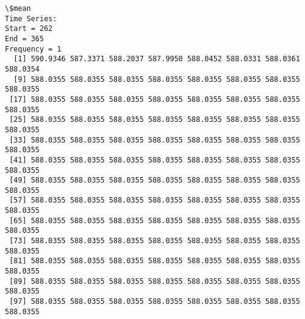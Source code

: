 \documentclass[11pt]{article}
\begin{document}
    \begin{Verbatim}[commandchars=\\\{\}]
\$mean
Time Series:
Start = 262 
End = 365 
Frequency = 1 
  [1] 590.9346 587.3371 588.2037 587.9950 588.0452 588.0331 588.0361 588.0354
  [9] 588.0355 588.0355 588.0355 588.0355 588.0355 588.0355 588.0355 588.0355
 [17] 588.0355 588.0355 588.0355 588.0355 588.0355 588.0355 588.0355 588.0355
 [25] 588.0355 588.0355 588.0355 588.0355 588.0355 588.0355 588.0355 588.0355
 [33] 588.0355 588.0355 588.0355 588.0355 588.0355 588.0355 588.0355 588.0355
 [41] 588.0355 588.0355 588.0355 588.0355 588.0355 588.0355 588.0355 588.0355
 [49] 588.0355 588.0355 588.0355 588.0355 588.0355 588.0355 588.0355 588.0355
 [57] 588.0355 588.0355 588.0355 588.0355 588.0355 588.0355 588.0355 588.0355
 [65] 588.0355 588.0355 588.0355 588.0355 588.0355 588.0355 588.0355 588.0355
 [73] 588.0355 588.0355 588.0355 588.0355 588.0355 588.0355 588.0355 588.0355
 [81] 588.0355 588.0355 588.0355 588.0355 588.0355 588.0355 588.0355 588.0355
 [89] 588.0355 588.0355 588.0355 588.0355 588.0355 588.0355 588.0355 588.0355
 [97] 588.0355 588.0355 588.0355 588.0355 588.0355 588.0355 588.0355 588.0355


\end{Verbatim}
\end{document}
